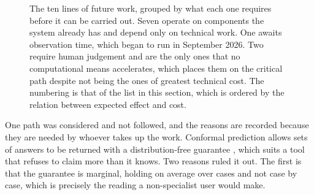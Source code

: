 \begin{figure}[htbp]
\centering
{}
\caption[The future lines, by what unblocks them]{The ten lines of future work, grouped by what
each one requires before it can be carried out. Seven operate on components the system already has
and depend only on technical work. One awaits observation time, which began to run in September
2026. Two require human judgement and are the only ones that no computational means accelerates,
which places them on the critical path despite not being the ones of greatest technical cost. The
numbering is that of the list in this section, which is ordered by the relation between expected
effect and cost.}
\label{fig:con_futuro}
\end{figure}

One path was considered and not followed, and the reasons are recorded because they are needed by
whoever takes up the work. Conformal prediction allows sets of answers to be returned with a
distribution-free guarantee \autocite{vovk2005algorithmic, angelopoulos2023conformal}, which suits
a tool that refuses to claim more than it knows. Two reasons ruled it out. The first is that the
guarantee is marginal, holding on average over cases and not case by case, which is precisely the
reading a non-specialist user would make.

